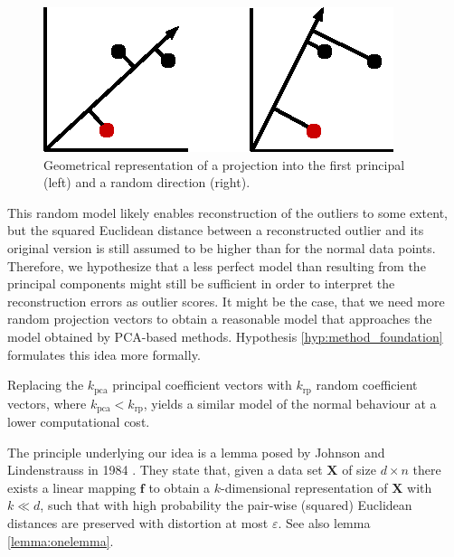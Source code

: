 \begin{figure}[h]
	\centering
	\includegraphics[scale=1.8]{rp-method/geometry_projections_rp1}
	\caption{Geometrical representation of a projection into the first principal (left) and a random direction (right).}
	\label{fig:method_geometry_rp}
\end{figure}

This random model likely enables reconstruction of the outliers to some extent, but the squared Euclidean distance between a reconstructed outlier and its original version is still assumed to be higher than for the normal data points. Therefore, we hypothesize that a less perfect model than resulting from the principal components might still be sufficient in order to interpret the reconstruction errors as outlier scores. It might be the case, that we need more random projection vectors to obtain a reasonable model that approaches the model obtained by PCA-based methods. Hypothesis \ref{hyp:method_foundation} formulates this idea more formally.

\vspace{0.2cm}
\begin{hypothesis}\label{hyp:method_foundation}
	Replacing the $k_{\text{pca}}$ principal coefficient vectors with $k_{\text{rp}}$ random coefficient vectors, where $k_{\text{pca}} < k_{\text{rp}}$, yields a similar model of the normal behaviour at a lower computational cost.
\end{hypothesis}
\vspace{0.2cm}

The principle underlying our idea is a lemma posed by Johnson and Lindenstrauss in 1984 \cite{johnson1984extensions}. They state that, given a data set $\mathbf{X}$ of size $d \times n$ there exists a linear mapping $\mathbf{f}$ to obtain a $k$-dimensional representation of $\mathbf{X}$ with $k \ll d$, such that with high probability the pair-wise (squared) Euclidean distances are preserved with distortion at most $\varepsilon$. See also lemma \ref{lemma:onelemma}.

